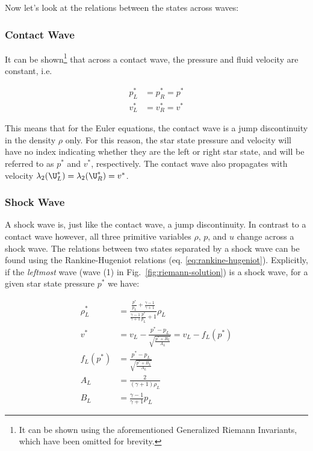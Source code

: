 Now let's look at the relations between the states across waves:






\subsubsection{Contact Wave}

It can be shown\footnote{It can be shown using the aforementioned Generalized Riemann Invariants,
which have been omitted for brevity.} that across a contact wave, the pressure and fluid velocity
are constant, i.e.

\begin{align}
	p^*_L &= p^*_R = p^*\\
	v^*_L &= v^*_R = v^*
\end{align}


This means that for the Euler equations, the contact wave is a jump discontinuity in the density
$\rho$ only. For this reason, the star state pressure and velocity will have no index indicating
whether they are the left or right star state, and will be referred to as $p^*$ and $v^*$,
respectively. The contact wave also propagates with velocity $\lambda_2(\U_L^*) = \lambda_2(\U_R^*)
= v^*$.









\subsubsection{Shock Wave}

A shock wave is, just like the contact wave, a jump discontinuity. In contrast to a contact wave
however, all three primitive variables $\rho$, $p$, and $u$ change across a shock wave. The
relations between two states separated by a shock wave can be found using the Rankine-Hugeniot
relations (eq. \ref{eq:rankine-hugeniot}).
Explicitly, if the \emph{leftmost} wave (wave (1) in Fig.~\ref{fig:riemann-solution}) is a shock
wave, for a given star state pressure $p^*$ we have:

\begin{align}
	\rho^*_L &=
		\frac{\frac{p^*}{p_L} + \frac{\gamma - 1}{\gamma+1}}{\frac{\gamma - 1}{\gamma+1}
\frac{p^*}{p_L} + 1} \rho_L \label{eq:rho-shock-first}\\
	v^* &=
		v_L - \frac{p^* - p_L}{\sqrt{\frac{p^* + B_L}{A_L}}}
		= v_L - f_L(p^*) \label{eq:velocity-shock-left} \\
    f_L(p^*) &=
        \frac{p^* - p_L}{\sqrt{\frac{p^* + B_L}{A_L}}} \\
	A_L &=
		\frac{2}{(\gamma + 1) \rho_L}\\
	B_L &=
		\frac{\gamma - 1}{\gamma + 1} p_L
\end{align}

